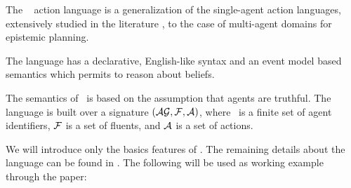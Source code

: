 The \mAL~\cite{baral2015action} action language is a generalization of the single-agent
action languages, extensively studied in the literature
\cite{modernApproach, bolander2011epistemic}, to the case of multi-agent
domains for epistemic planning.

The language has a declarative, English-like
syntax and an event model based semantics which permits to reason about beliefs.

The semantics of \mAL\ is based on the assumption that agents are
truthful. The language is built over a signature $(\mathcal{AG},\mathcal{F},\mathcal{A})$, where \sAG\ is
a finite set of agent identifiers, $\mathcal{F}$ is a set of fluents, and
$\mathcal{A}$ is a set of actions.

We will introduce only the basics
features of \mAL.
The remaining details about the language can be found in
\cite{baral2015action}. The following will be used as working 
example through the paper:

